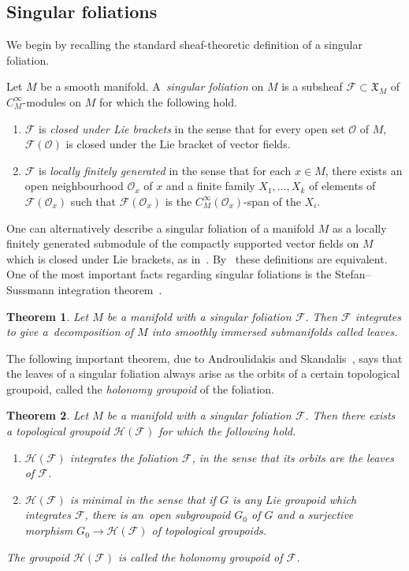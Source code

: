 \documentclass[10pt,a4paper]{amsart}
\numberwithin{equation}{section}
\newtheorem{Theorem}{Theorem}[section]
\def\FF{{\mathcal{F}}}
\def\HH{{\mathcal{H}}}
\def\OO{{\mathcal{O}}}
\def\XF{{\mathfrak{X}}}
\begin{document}
\subsection{Singular foliations}

We begin by recalling the standard sheaf-theoretic definition of a singular foliation.

\begin{Definition}\label{singdef}
Let $M$ be a smooth manifold. A~\textit{singular foliation} on $M$ is a subsheaf $\FF\subset \XF_{M}$ of $C^{\infty}_{M}$-modules on $M$ for which the following hold.
\begin{enumerate}\itemsep=0pt
\item $\FF$ is \textit{closed under Lie brackets} in the sense that for every open set $\OO$ of $M$, $\FF(\OO)$ is closed under the Lie bracket of vector fields.
\item $\FF$ is \textit{locally finitely generated} in the sense that for each $x\in M$, there exists an open neighbourhood $\OO_{x}$ of $x$ and a finite family $X_{1},\dots,X_{k}$ of elements of $\FF(\OO_{x})$ such that $\FF(\OO_{x})$ is the $C^{\infty}_{M}(\OO_{x})$-span of the $X_{i}$.
\end{enumerate}
\end{Definition}

One can alternatively describe a singular foliation of a manifold $M$ as a locally finitely generated submodule of the compactly supported vector fields on $M$ which is closed under Lie brackets, as in~\cite{iakovos2}. By~\cite[Remark 1.8]{GarZam} these definitions are equivalent. One of the most important facts regarding singular foliations is the Stefan--Sussmann integration theorem~\cite{stefan, sussmann}.

\begin{Theorem}%
Let $M$ be a manifold with a singular foliation $\FF$. Then $\FF$ integrates to give a~decom\-position of $M$ into smoothly immersed submanifolds called leaves.
\end{Theorem}

The following important theorem, due to Androulidakis and Skandalis~\cite[Theorem~0.1]{iakovos2}, says that the leaves of a singular foliation always arise as the orbits of a certain topological groupoid, called the \textit{holonomy groupoid} of the foliation.

\begin{Theorem}\label{integrate}
Let $M$ be a manifold with a singular foliation $\FF$. Then there exists a topological groupoid $\HH(\FF)$ for which the following hold.
\begin{enumerate}\itemsep=0pt
\item[$1.$] $\HH(\FF)$ \textit{integrates} the foliation $\FF$, in the sense that its orbits are the leaves of $\FF$.
\item[$2.$] $\HH(\FF)$ is \textit{minimal} in the sense that if $G$ is any Lie groupoid which integrates $\FF$, there is an~open subgroupoid $G_{0}$ of $G$ and a surjective morphism $G_{0}\rightarrow\HH(\FF)$ of topological groupoids.
\end{enumerate}
The groupoid $\HH(\FF)$ is called the \textit{holonomy groupoid} of $\FF$.
\end{Theorem}
\end{document}
